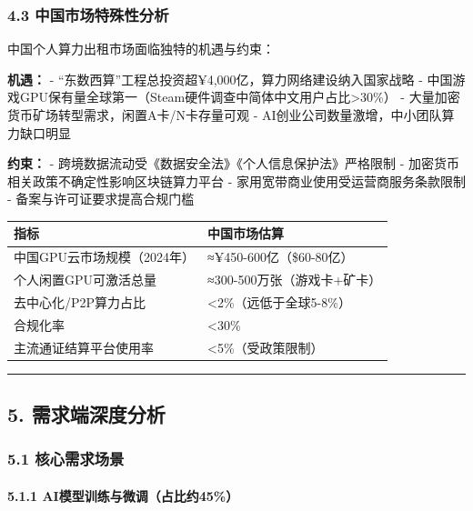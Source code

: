 \documentclass[UTF8,a4paper,12pt]{ctexart}
\begin{document}
\subsubsection{4.3
中国市场特殊性分析}\label{ux4e2dux56fdux5e02ux573aux7279ux6b8aux6027ux5206ux6790}

中国个人算力出租市场面临独特的机遇与约束：

\textbf{机遇：} -
``东数西算''工程总投资超¥4,000亿，算力网络建设纳入国家战略 -
中国游戏GPU保有量全球第一（Steam硬件调查中简体中文用户占比\textgreater30\%）
- 大量加密货币矿场转型需求，闲置A卡/N卡存量可观 -
AI创业公司数量激增，中小团队算力缺口明显

\textbf{约束：} - 跨境数据流动受《数据安全法》《个人信息保护法》严格限制
- 加密货币相关政策不确定性影响区块链算力平台 -
家用宽带商业使用受运营商服务条款限制 - 备案与许可证要求提高合规门槛

{\def\LTcaptype{none} %
\begin{longtable}[]{@{}ll@{}}
\toprule\noalign{}
指标 & 中国市场估算 \\
\midrule\noalign{}
\endhead
\bottomrule\noalign{}
\endlastfoot
中国GPU云市场规模（2024年） & ≈¥450-600亿（\$60-80亿） \\
个人闲置GPU可激活总量 & ≈300-500万张（游戏卡+矿卡） \\
去中心化/P2P算力占比 & \textless2\%（远低于全球5-8\%） \\
合规化率 & \textless30\% \\
主流通证结算平台使用率 & \textless5\%（受政策限制） \\
\end{longtable}
}

\begin{center}\rule{0.5\linewidth}{0.5pt}\end{center}

\pagebreak

\subsection{5.
需求端深度分析}\label{ux9700ux6c42ux7aefux6df1ux5ea6ux5206ux6790}

\subsubsection{5.1
核心需求场景}\label{ux6838ux5fc3ux9700ux6c42ux573aux666f}

\paragraph{5.1.1
AI模型训练与微调（占比约45\%）}\label{aiux6a21ux578bux8badux7ec3ux4e0eux5faeux8c03ux5360ux6bd4ux7ea645}
\end{document}
